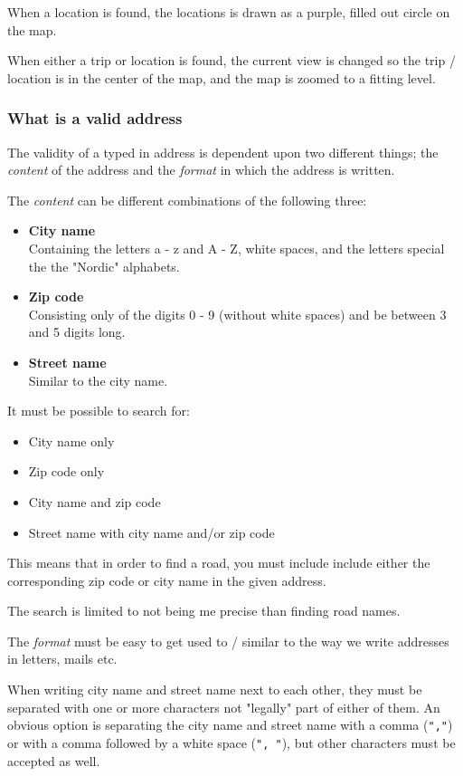 When a location is found, the locations is drawn as a purple, filled out circle on the map.

When either a trip or location is found, the current view is changed so the trip / location is in the center of the map, and the map is zoomed to a fitting level.

\subsubsection{What is a valid address}
\label{sec:What is a valid address}
The validity of a typed in address is dependent upon two different things; the \textit{content} of the address and the \textit{format} in which the address is written.

The \textit{content} can be different combinations of the following three:
\begin{itemize}
	\item \textbf{City name} \\
		Containing the letters a - z and A - Z, white spaces, and the letters special the the "Nordic" alphabets.
	\item \textbf{Zip code} \\
		Consisting only of the digits 0 - 9 (without white spaces) and be between 3 and 5 digits long.
	\item \textbf{Street name} \\
		Similar to the city name.
\end{itemize}
It must be possible to search for:
\begin{itemize}
	\item City name only
	\item Zip code only
	\item City name and zip code
	\item Street name with city name and/or zip code
\end{itemize}
This means that in order to find a road, you must include include either the corresponding zip code or city name in the given address.

The search is limited to not being me precise than finding road names.

The \textit{format} must be easy to get used to / similar to the way we write addresses in letters, mails etc.

When writing city name and street name next to each other, they must be separated with one or more characters not "legally" part of either of them. An obvious option is separating the city name and street name with a comma (\texttt{","}) or with a comma followed by a white space (\texttt{", "}), but other characters must be accepted as well.

